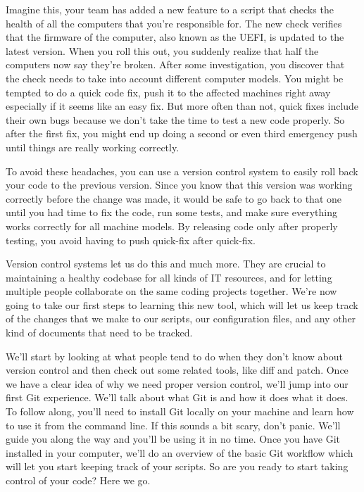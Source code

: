 	Imagine this, your team has added a new feature to a script that checks the health of all the computers that you're responsible for. The new check verifies that the firmware of the computer, also known as the UEFI, is updated to the latest version. When you roll this out, you suddenly realize that half the computers now say they're broken. After some investigation, you discover that the check needs to take into account different computer models. You might be tempted to do a quick code fix, push it to the affected machines right away especially if it seems like an easy fix. 
	But more often than not, quick fixes include their own bugs because we don't take the time to test a new code properly. So after the first fix, you might end up doing a second or even third emergency push until things are really working correctly. 
	
	To avoid these headaches, you can use a version control system to easily roll back your code to the previous version. Since you know that this version was working correctly before the change was made, it would be safe to go back to that one until you had time to fix the code, run some tests, and make sure everything works correctly for all machine models. By releasing code only after properly testing, you avoid having to push quick-fix after quick-fix. 
	
	Version control systems let us do this and much more. They are crucial to maintaining a healthy codebase for all kinds of IT resources, and for letting multiple people collaborate on the same coding projects together. We're now going to take our first steps to learning this new tool, which will let us keep track of the changes that we make to our scripts, our configuration files, and any other kind of documents that need to be tracked.
	
	We'll start by looking at what people tend to do when they don't know about version control and then check out some related tools, like diff and patch. 
	Once we have a clear idea of why we need proper version control, we'll jump into our first Git experience. 
	We'll talk about what Git is and how it does what it does. 
	To follow along, you'll need to install Git locally on your machine and learn how to use it from the command line. If this sounds a bit scary, don't panic. We'll guide you along the way and you'll be using it in no time. Once you have Git installed in your computer, we'll do an overview of the basic Git workflow which will let you start keeping track of your scripts. So are you ready to start taking control of your code? Here we go.
	
